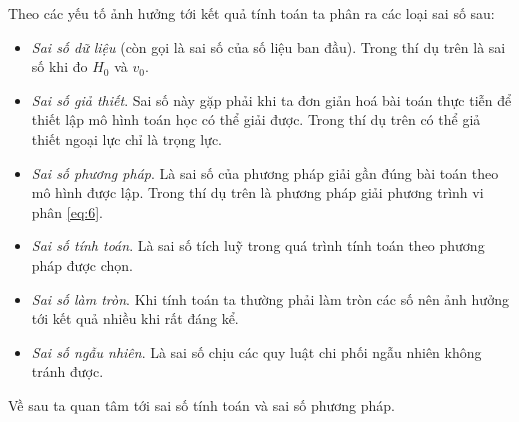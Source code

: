 \documentclass{article}    %
\begin{document}
Theo các yếu tố ảnh hưởng tới kết quả tính toán ta phân ra các loại sai số sau:
\begin{itemize}
    \item \emph{Sai số dữ liệu} (còn gọi là sai số của số liệu ban đầu). Trong
        thí dụ trên là sai số khi đo \(H_0\) và \(v_0\).
    \item \emph{Sai số giả thiết}. Sai số này gặp phải khi ta đơn giản hoá bài
        toán thực tiễn để thiết lập mô hình toán học có thể giải được. Trong thí
        dụ trên có thể giả thiết ngoại lực chỉ là trọng lực.
    \item \emph{Sai số phương pháp}. Là sai số của phương pháp giải gần đúng bài
        toán theo mô hình được lập. Trong thí dụ trên là phương pháp giải phương
        trình vi phân \ref{eq:6}.
    \item \emph{Sai số tính toán}. Là sai số tích luỹ trong quá trình tính toán
        theo phương pháp được chọn.
    \item \emph{Sai số làm tròn}. Khi tính toán ta thường phải làm tròn các số
        nên ảnh hưởng tới kết quả nhiều khi rất đáng kể.
    \item \emph{Sai số ngẫu nhiên}. Là sai số chịu các quy luật chi phối ngẫu
        nhiên không tránh được.
\end{itemize}

Về sau ta  quan tâm tới sai số tính toán và sai số phương pháp.
\end{document}
